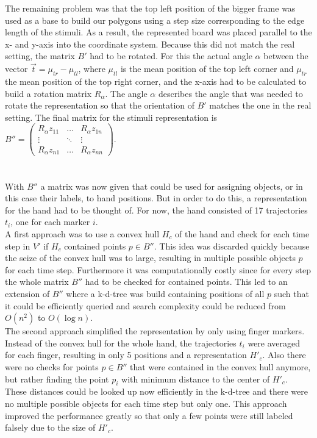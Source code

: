 The remaining problem was that the top left position of the bigger frame was used as a base to build our polygons using a step size corresponding to the edge length of the stimuli. As a result, the represented board was placed parallel to the x- and y-axis into the coordinate system. Because this did not match the real setting, the matrix $ B' $ had to be rotated. For this the actual angle $ \alpha $ between the vector $\vec{t} = \mu_{tr} - \mu_{tl}$, where $\mu_{tl}$ is the mean position of the top left corner and $\mu_{tr}$ the mean position of the top right corner,  and the x-axis had to be calculated to build a rotation matrix $ R_{\alpha} $. The angle $\alpha$ describes the angle that was needed to rotate the representation so that the orientation of $ B' $ matches the one in the real setting. The final matrix for the stimuli representation is $ B''  = \begin{pmatrix}
 R_{\alpha}z_{11} & \hdots &  R_{\alpha}z_{1n} \\
\vdots & \ddots & \vdots \\
 R_{\alpha}z_{n1} & \hdots &  R_{\alpha}z_{nn}
\end{pmatrix}$.\\
\\
\\
With $ B'' $ a matrix was now given that could be used for assigning objects, or in this case their labels, to hand positions. But in order to do this, a representation for the hand had to be thought of. For now, the hand consisted of 17 trajectories $ t_{i} $, one for each marker $ i $. \\
A first approach was to use a convex hull $ H_{c} $ of the hand and check for each time step in $ V' $ if $ H_{c} $ contained points $ p \in B'' $. This idea was discarded quickly because the seize of the convex hull was to large, resulting in multiple possible objects $ p $ for each time step. Furthermore it was computationally costly since for every step the whole matrix $ B'' $ had to be checked for contained points. This led to an extension of $ B'' $ where a k-d-tree was build containing positions of all $p$ such that it could be efficiently queried and search complexity could be reduced from $ O(n^{2}) $ to $ O(\log n) $. \\
The second approach simplified the representation by only using finger markers. Instead of the convex hull for the whole hand, the trajectories $ t_{i} $ were averaged for each finger, resulting in only 5 positions and a representation $ H'_{c} $. Also there were no checks for points $ p \in B'' $ that were contained in the convex hull anymore, but rather finding the point $ p_{i} $ with minimum distance to the center of $ H'_{c} $. These distances could be looked up now efficiently in the k-d-tree and there were no multiple possible objects for each time step but only one. This approach improved the performance greatly so that only a few points were still labeled falsely due to the size of $ H'_{c} $.\\
